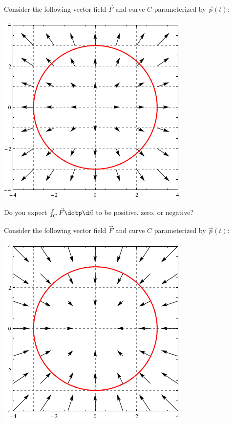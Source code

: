 \documentclass{ximera}
\begin{document}
\begin{question}
  Consider the following vector field $\vec{F}$ and curve $C$
  parameterized by $\vec{p}(t)$:
  \begin{image}
    \includegraphics{circPosDivVecField.png}
  \end{image}
  Do you expect $\oint_C\vec{F} \dotp \d\vec{n}$ to be positive, zero,
  or negative?
  \begin{prompt}
    \begin{multipleChoice}
    \end{multipleChoice}
  \end{prompt}
  \begin{question}
  Consider the following vector field $\vec{F}$ and curve $C$
  parameterized by $\vec{p}(t)$:
  \begin{image}
    \includegraphics{circNegDivVecField.png}

\end{image}
\end{question}
\end{question}
\end{document}
